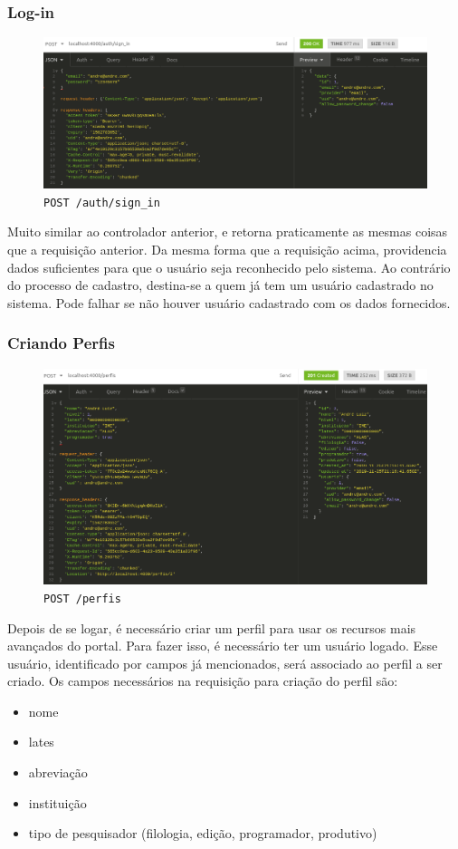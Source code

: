 \subsubsection{Log-in}

\begin{figure}[ht]
    \centering
    \includegraphics[width=.75\textwidth]{figuras/sign-in.png}
    \caption{\texttt{POST /auth/sign\_in}}
    \label{fig:sign-in}
\end{figure}

Muito similar ao controlador anterior, e retorna praticamente as mesmas coisas que a requisição anterior. Da mesma forma
que a requisição acima, providencia dados suficientes para que o usuário seja reconhecido pelo sistema. Ao contrário do
processo de cadastro, destina-se a quem já tem um usuário cadastrado no sistema. Pode falhar se não houver usuário
cadastrado com os dados fornecidos.

\subsubsection{Criando Perfis}

\begin{figure}[h]
    \centering
    \includegraphics[width=.75\textwidth]{figuras/novo-perfil.png}
    \caption{\texttt{POST /perfis}}
    \label{fig:novo-perfil}
\end{figure}

Depois de se logar, é necessário criar um perfil para usar os recursos mais avançados do portal. Para fazer isso, é
necessário ter um usuário logado. Esse usuário, identificado por campos já mencionados, será associado ao perfil a ser
criado. Os campos necessários na requisição para criação do perfil são:
\begin{itemize}
    \item nome
    \item lates
    \item abreviação
    \item instituição
    \item tipo de pesquisador (filologia, edição, programador, produtivo)
\end{itemize}

